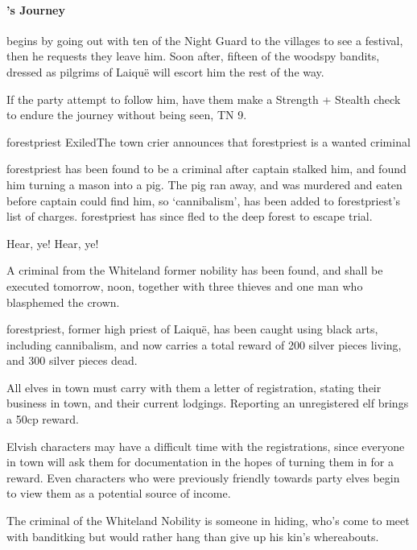 \begin{multicols}{2}
\paragraph{'s Journey}
begins by going out with ten of the Night Guard to the villages to see a festival, then he requests they leave him.
Soon after, fifteen of the woodspy bandits, dressed as pilgrims of Laiqu\"e will escort him the rest of the way.

If the party attempt to follow him, have them make a Strength + Stealth check to endure the journey without being seen, TN 9.



{\Gls{forestpriest}%
 Exiled}{The town crier announces that \gls{forestpriest} is a wanted criminal}%

\Gls{forestpriest} has been found to be a criminal after \gls{captain} stalked him, and found him turning a mason into a pig.
The pig ran away, and was murdered and eaten before \gls{captain} could find him, so `cannibalism', has been added to \gls{forestpriest}'s list of charges.
\Gls{forestpriest} has since fled to the deep forest to escape trial.

\begin{speechtext}

	Hear, ye! Hear, ye!

	A criminal from the Whiteland former nobility has been found, and shall be executed tomorrow, noon, together with three thieves and one man who blasphemed the crown.

	\Gls{forestpriest}, former high priest of Laiqu\"{e}, has been caught using black arts, including cannibalism, and now carries a total reward of 200 silver pieces living, and 300 silver pieces dead.

	All elves in town must carry with them a letter of registration, stating their business in town, and their current lodgings.  Reporting an unregistered elf brings a 50cp reward.

\end{speechtext}

Elvish characters may have a difficult time with the registrations, since everyone in town will ask them for documentation in the hopes of turning them in for a reward.
Even characters who were previously friendly towards party elves begin to view them as a potential source of income.

The criminal of the Whiteland Nobility is someone in hiding, who's come to meet with \gls{banditking} but would rather hang than give up his kin's whereabouts.


\end{multicols}

